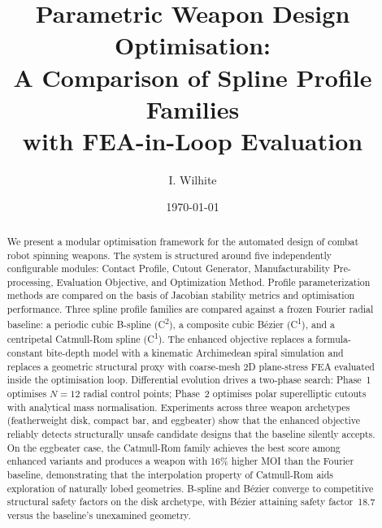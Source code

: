 \documentclass[10pt,twocolumn]{article}
\title{\textbf{Parametric Weapon Design Optimisation:\\
  A Comparison of Spline Profile Families\\
  with FEA-in-Loop Evaluation}}
\author{I. Wilhite}
\date{\today}
\begin{document}
\maketitle

\begin{abstract}
We present a modular optimisation framework for the automated design of combat
robot spinning weapons.  The system is structured around five independently
configurable modules: Contact Profile, Cutout Generator, Manufacturability Pre-processing, Evaluation Objective, and Optimization Method. Profile parameterization methods are compared on the basis of Jacobian stability metrics and optimisation performance.
Three spline
profile families are compared against a frozen Fourier radial baseline: a
periodic cubic B-spline (C\textsuperscript{2}), a composite cubic
B\'{e}zier (C\textsuperscript{1}), and a centripetal Catmull-Rom spline
(C\textsuperscript{1}).  The enhanced objective replaces a formula-constant
bite-depth model with a kinematic Archimedean spiral simulation and replaces
a geometric structural proxy with coarse-mesh 2D plane-stress FEA evaluated
inside the optimisation loop.  Differential evolution drives a two-phase
search: Phase~1 optimises $N{=}12$ radial control points; Phase~2 optimises
polar superelliptic cutouts with analytical mass normalisation.
Experiments across three weapon archetypes (featherweight disk, compact bar,
and eggbeater) show that the enhanced objective reliably
detects structurally unsafe candidate designs that the baseline silently
accepts.  On the eggbeater case, the Catmull-Rom family achieves the best
score among enhanced variants and produces a weapon with 16\% higher MOI
than the Fourier baseline, demonstrating that the interpolation property of
Catmull-Rom aids exploration of naturally lobed geometries.  B-spline and
B\'{e}zier converge to competitive structural safety factors on the disk
archetype, with B\'{e}zier attaining safety factor~18.7 versus the baseline's
unexamined geometry.
\end{abstract}
\end{document}
